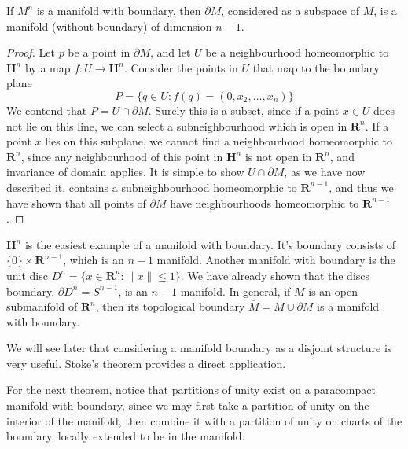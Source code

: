 \begin{theorem}
    If $M^n$ is a manifold with boundary, then $\partial M$, considered as a subspace of $M$, is a manifold (without boundary) of dimension $n-1$.
\end{theorem}
\begin{proof}
    Let $p$ be a point in $\partial M$, and let $U$ be a neighbourhood homeomorphic to $\mathbf{H}^n$ by a map $f:U \to \mathbf{H}^n$. Consider the points in $U$ that map to the boundary plane
    \[ P = \{ q \in U : f(q) = (0,x_2, \dots, x_n) \} \]
    We contend that $P = U \cap \partial M$. Surely this is a subset, since if a point $x \in U$ does not lie on this line, we can select a subneighbourhood which is open in $\mathbf{R}^n$. If a point $x$ lies on this subplane, we cannot find a neighbourhood homeomorphic to $\mathbf{R}^n$, since any neighbourhood of this point in $\mathbf{H}^n$ is not open in $\mathbf{R}^n$, and invariance of domain applies. It is simple to show $U \cap \partial M$, as we have now described it, contains a subneighbourhood homeomorphic to $\mathbf{R}^{n-1}$, and thus we have shown that all points of $\partial M$ have neighbourhoods homeomorphic to $\mathbf{R}^{n-1}$.
\end{proof}

\begin{example}
    $\mathbf{H}^n$ is the easiest example of a manifold with boundary. It's boundary consists of $\{ 0 \} \times \mathbf{R}^{n-1}$, which is an $n - 1$ manifold. Another manifold with boundary is the unit disc $D^n = \{ x \in \mathbf{R}^n : \|x\| \leq 1 \}$. We have already shown that the discs boundary, $\partial D^n = S^{n-1}$, is an $n - 1$ manifold. In general, if $M$ is an open submanifold of $\mathbf{R}^n$, then its topological boundary $\overline{M} = M \cup \partial M$ is a manifold with boundary.
\end{example}

We will see later that considering a manifold boundary as a disjoint structure is very useful. Stoke's theorem provides a direct application.










For the next theorem, notice that partitions of unity exist on a paracompact manifold with boundary, since we may first take a partition of unity on the interior of the manifold, then combine it with a partition of unity on charts of the boundary, locally extended to be in the manifold.

